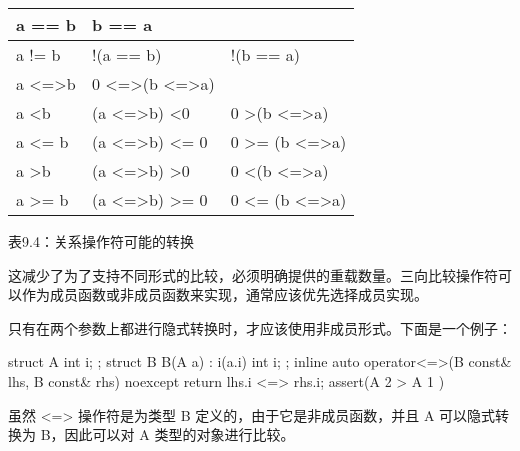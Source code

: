 \begin{longtable}{|l|l|l|}
\hline
a == b & b == a    &           \\ \hline
\endfirsthead
%
\endhead
%
a != b & !(a == b) & !(b == a) \\ \hline
a \textless{}=\textgreater b & 0 \textless{}=\textgreater (b \textless{}=\textgreater a) &                                                  \\ \hline
a \textless b                & (a \textless{}=\textgreater b) \textless 0                & 0 \textgreater (b \textless{}=\textgreater a)    \\ \hline
a \textless{}= b             & (a \textless{}=\textgreater b) \textless{}= 0             & 0 \textgreater{}= (b \textless{}=\textgreater a) \\ \hline
a \textgreater b             & (a \textless{}=\textgreater b) \textgreater 0             & 0 \textless (b \textless{}=\textgreater a)       \\ \hline
a \textgreater{}= b          & (a \textless{}=\textgreater b) \textgreater{}= 0          & 0 \textless{}= (b \textless{}=\textgreater a)    \\ \hline
\end{longtable}

\begin{center}
表9.4：关系操作符可能的转换
\end{center}

这减少了为了支持不同形式的比较，必须明确提供的重载数量。三向比较操作符可以作为成员函数或非成员函数来实现，通常应该优先选择成员实现。

只有在两个参数上都进行隐式转换时，才应该使用非成员形式。下面是一个例子：

\begin{cpp}
struct A { int i; };
struct B
{
    B(A a) : i(a.i) { }
    int i;
};
inline auto
operator<=>(B const& lhs, B const& rhs) noexcept
{
    return lhs.i <=> rhs.i;
}
assert(A{ 2 } > A{ 1 })
\end{cpp}

虽然 <=> 操作符是为类型 B 定义的，由于它是非成员函数，并且 A 可以隐式转换为 B，因此可以对 A 类型的对象进行比较。

